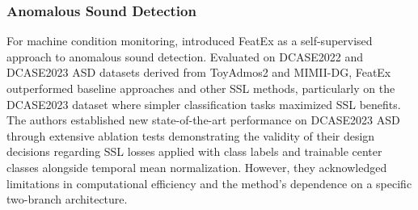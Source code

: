 \documentclass[11pt]{article}
\begin{document}
\subsubsection{Anomalous Sound Detection}
For machine condition monitoring, \citep{wilkinghoff2023selfsupervisedlearninganomaloussound} introduced FeatEx as a self-supervised approach to anomalous sound detection. Evaluated on DCASE2022 and DCASE2023 ASD datasets derived from ToyAdmos2 and MIMII-DG, FeatEx outperformed baseline approaches and other SSL methods, particularly on the DCASE2023 dataset where simpler classification tasks maximized SSL benefits. The authors established new state-of-the-art performance on DCASE2023 ASD through extensive ablation tests demonstrating the validity of their design decisions regarding SSL losses applied with class labels and trainable center classes alongside temporal mean normalization. However, they acknowledged limitations in computational efficiency and the method's dependence on a specific two-branch architecture.
\end{document}
